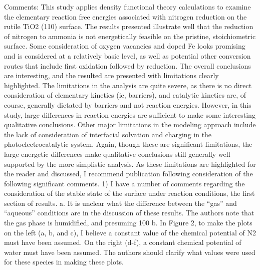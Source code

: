 Comments:
This study applies density functional theory calculations to examine the elementary reaction free energies associated with nitrogen reduction on the rutile TiO2 (110) surface.  The results presented illustrate well that the reduction of nitrogen to ammonia is not energetically feasible on the pristine, stoichiometric surface.  Some consideration of oxygen vacancies and doped Fe looks promising and is considered at a relatively basic level, as well as potential other conversion routes that include first oxidation followed by reduction.  The overall conclusions are interesting, and the resulted are presented with limitations clearly highlighted.  The limitations in the analysis are quite severe, as there is no direct consideration of elementary kinetics (ie, barriers), and catalytic kinetics are, of course, generally dictated by barriers and not reaction energies.  However, in this study, large differences in reaction energies are sufficient to make some interesting qualitative conclusions.  Other major limitations in the modeling approach include the lack of consideration of interfacial solvation and charging in the photoelectrocatalytic system.  Again, though these are significant limitations, the large energetic differences make qualitative conclusions still generally well supported by the more simplistic analysis. As these limitations are highlighted for the reader and discussed, I recommend publication following consideration of the following significant comments.
1)       I have a number of comments regarding the consideration of the stable state of the surface under reaction conditions, the first section of results.
a.      It is unclear what the difference between the “gas” and “aqueous” conditions are in the discussion of these results.  The authors note that the gas phase is humidified, and presuming 100%
b.      In Figure 2, to make the plots on the left (a, b, and c), I believe a constant value of the chemical potential of N2 must have been assumed.  On the right (d-f), a constant chemical potential of water must have been assumed.  The authors should clarify what values were used for these species in making these plots.
